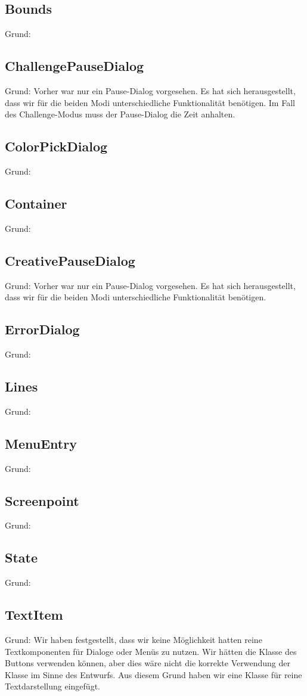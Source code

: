\subsection{Bounds}
Grund:
\subsection{ChallengePauseDialog}
Grund: Vorher war nur ein Pause-Dialog vorgesehen. Es hat sich herausgestellt, dass wir für die beiden Modi unterschiedliche Funktionalität benötigen. Im Fall des Challenge-Modus muss der Pause-Dialog die Zeit anhalten.
\subsection{ColorPickDialog}
Grund:
\subsection{Container}
Grund:
\subsection{CreativePauseDialog}
Grund: Vorher war nur ein Pause-Dialog vorgesehen. Es hat sich herausgestellt, dass wir für die beiden Modi unterschiedliche Funktionalität benötigen.
\subsection{ErrorDialog}
Grund:
\subsection{Lines}
Grund:
\subsection{MenuEntry}
Grund:
\subsection{Screenpoint}
Grund:
\subsection{State}
Grund:
\subsection{TextItem}
Grund: Wir haben festgestellt, dass wir keine Möglichkeit hatten reine Textkomponenten für Dialoge oder Menüs zu nutzen. Wir hätten die Klasse des Buttons verwenden können, aber dies wäre nicht die korrekte Verwendung der Klasse im Sinne des Entwurfs. Aus diesem Grund haben wir eine Klasse für reine Textdarstellung eingefügt.

